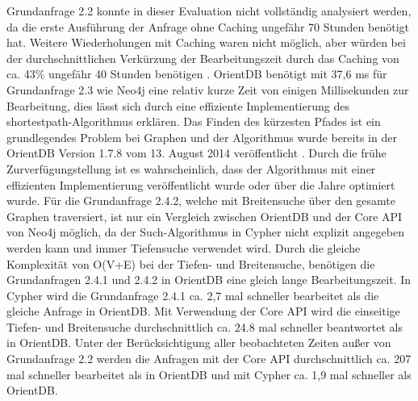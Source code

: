  Grundanfrage 2.2 konnte in dieser Evaluation nicht vollständig analysiert werden, da die erste Ausführung der Anfrage ohne Caching ungefähr 70 Stunden benötigt hat. Weitere Wiederholungen mit Caching waren nicht möglich, aber würden bei der durchschnittlichen Verkürzung der Bearbeitungszeit durch das Caching von ca. 43\%  ungefähr 40 Stunden benötigen . \newline
OrientDB benötigt mit 37,6 ms für Grundanfrage 2.3  wie Neo4j eine relativ kurze Zeit von einigen Millisekunden zur Bearbeitung, dies lässt sich durch eine effiziente Implementierung des shortestpath-Algorithmus erklären. Das Finden des kürzesten Pfades ist ein grundlegendes Problem bei Graphen und der Algorithmus wurde bereits in der OrientDB Version 1.7.8 vom 13. August 2014 veröffentlicht \parencite{Old_OrientDB}. Durch die frühe Zurverfügungstellung ist es wahrscheinlich, dass der Algorithmus mit einer effizienten Implementierung veröffentlicht wurde oder über die Jahre optimiert wurde. \newline
Für die Grundanfrage 2.4.2, welche mit Breitensuche über den gesamte Graphen traversiert, ist nur ein Vergleich zwischen OrientDB und der Core API von Neo4j möglich, da der Such-Algorithmus in Cypher nicht explizit angegeben werden kann und immer Tiefensuche verwendet wird. Durch die gleiche Komplexität von O(V+E) bei der Tiefen- und Breitensuche, benötigen die Grundanfragen 2.4.1 und 2.4.2 in OrientDB eine gleich lange Bearbeitungszeit. In Cypher wird die Grundanfrage 2.4.1 ca. 2,7 mal schneller bearbeitet als die gleiche Anfrage in OrientDB. Mit Verwendung der Core API wird die einseitige Tiefen- und Breitensuche durchschnittlich ca. 24.8 mal schneller beantwortet als in OrientDB. \newline
 Unter der Berücksichtigung aller beobachteten Zeiten außer von Grundanfrage 2.2 werden die Anfragen mit der Core API durchschnittlich ca. 207 mal schneller bearbeitet als in OrientDB und mit Cypher ca. 1,9 mal schneller als OrientDB. 
\FloatBarrier

